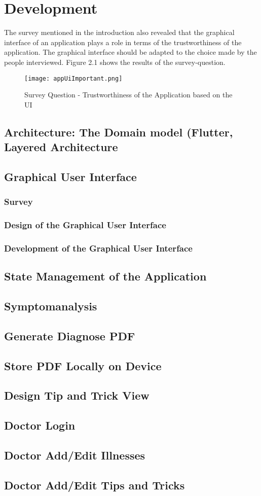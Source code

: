 

\chapter{Development}
The survey mentioned in the introduction also revealed that the graphical interface of an application plays a role in terms of the trustworthiness of the application. The graphical interface should be adapted to the choice made by the people interviewed. Figure 2.1 shows the results of the survey-question.
\begin{figure}[h]
	\centering
	\texttt{[image: appUiImportant.png]}
	\caption[Survey Question]{Survey Question - Trustworthiness of the Application based on the UI}
\end{figure}
\section{Architecture: The Domain model (Flutter, Layered Architecture}
\section{Graphical User Interface}
\subsection{Survey}
\subsection{Design of the Graphical User Interface}
\subsection{Development of the Graphical User Interface}
\section{State Management of the Application}
\section{Symptomanalysis}
\section{Generate Diagnose PDF}
\section{Store PDF Locally on Device}
\section{Design Tip and Trick View}
\section{Doctor Login}
\section{Doctor Add/Edit Illnesses}
\section{Doctor Add/Edit Tips and Tricks}

